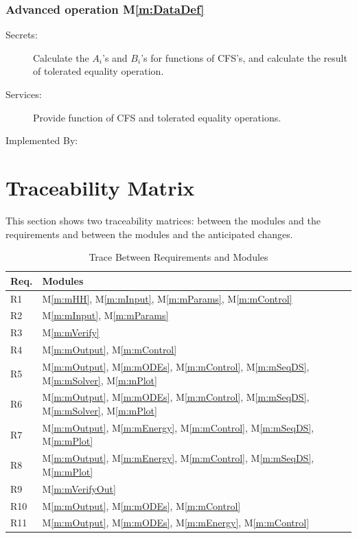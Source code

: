 \documentclass[12pt, titlepage]{article}
\newcommand{\mref}[1]{M\ref{m:#1}}
\begin{document}
\subsubsection{Advanced operation \mref{DataDef}}
\begin{description}
	\item[Secrets:] Calculate the $A_i$'s and $B_i$'s for functions of CFS's, and calculate the result of tolerated equality operation. 
	\item[Services:] Provide function of CFS and tolerated equality operations.
	\item[Implemented By:] \progname
\end{description}

\section{Traceability Matrix} \label{SecTM}

This section shows two traceability matrices: between the modules and the
requirements and between the modules and the anticipated changes.

\begin{table}[H]
\centering
\begin{tabular}{p{} p{}}
\toprule
\textbf{Req.} & \textbf{Modules}\\
\midrule
R1 & \mref{mHH}, \mref{mInput}, \mref{mParams}, \mref{mControl}\\
R2 & \mref{mInput}, \mref{mParams}\\
R3 & \mref{mVerify}\\
R4 & \mref{mOutput}, \mref{mControl}\\
R5 & \mref{mOutput}, \mref{mODEs}, \mref{mControl}, \mref{mSeqDS}, \mref{mSolver}, \mref{mPlot}\\
R6 & \mref{mOutput}, \mref{mODEs}, \mref{mControl}, \mref{mSeqDS}, \mref{mSolver}, \mref{mPlot}\\
R7 & \mref{mOutput}, \mref{mEnergy}, \mref{mControl}, \mref{mSeqDS}, \mref{mPlot}\\
R8 & \mref{mOutput}, \mref{mEnergy}, \mref{mControl}, \mref{mSeqDS}, \mref{mPlot}\\
R9 & \mref{mVerifyOut}\\
R10 & \mref{mOutput}, \mref{mODEs}, \mref{mControl}\\
R11 & \mref{mOutput}, \mref{mODEs}, \mref{mEnergy}, \mref{mControl}\\
\bottomrule
\end{tabular}
\caption{Trace Between Requirements and Modules}
\label{TblRT}
\end{table}
\end{document}
